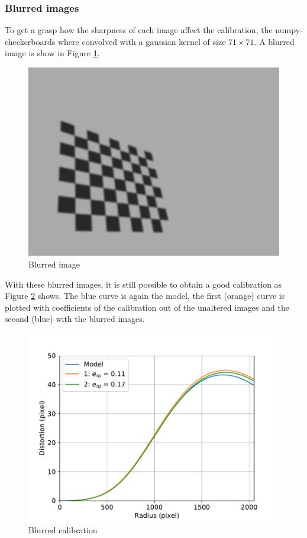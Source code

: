 \subsubsection{Blurred images}
To get a grasp how the sharpness of each image affect the calibration, the numpy-checkerboards where convolved with a gaussian kernel of size $71\times 71$.
A blurred image is show in Figure \ref{development:nump_blurred}.
\begin{figure}[ht]
	\centering
	\includegraphics[width=0.9\linewidth]{3-development/calibration/images/nump1_blurred.png}
	\caption{Blurred image\label{development:nump_blurred}}
\end{figure}
With these blurred images, it is still possible to obtain a good calibration as Figure \ref{development:blurred} shows.
The blue curve is again the model, the first (orange) curve is plotted with coefficients of the calibration out of the unaltered images and the second (blue) with the blurred images.
\begin{figure}[ht]
	\centering
	\includegraphics[width=0.9\linewidth]{3-development/calibration/images/blurred.pdf}
	\caption{Blurred calibration\label{development:blurred}}
\end{figure}
